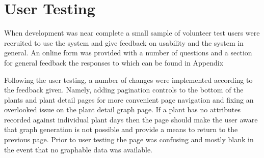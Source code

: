 \section{User Testing}

When development was near complete a small sample of volunteer test users were recruited to use the system and give feedback on usability and the system in general. An online form was provided with a number of questions and a section for general feedback the responses to which can be found in Appendix %

Following the user testing, a number of changes were implemented according to the feedback given. Namely, adding pagination controls to the bottom of the plants and plant detail pages for more convenient page navigation and fixing an overlooked issue on the plant detail graph page. If a plant has no attributes recorded against individual plant days then the page should make the user aware that graph generation is not possible and provide a means to return to the previous page. Prior to user testing the page was confusing and mostly blank in the event that no graphable data was available.


